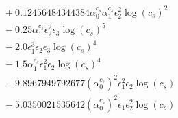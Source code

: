 \documentclass[10pt]{article}
\begin{document}
\begin{align*}
&{}  + 0.12456484344384 \alpha_{0}^{c_s} \alpha_{1}^{c_s} \epsilon_{2}^{2} \log{\left(c_{s} \right)}^{2} \\
&{}  - 0.25 \alpha_{1}^{c_s} \epsilon_{2}^{2} \epsilon_{3} \log{\left(c_{s} \right)}^{5} \\
&{}  - 2.0 \epsilon_{1}^{3} \epsilon_{2} \epsilon_{3} \log{\left(c_{s} \right)}^{4} \\
&{}  - 1.5 \alpha_{1}^{c_s} \epsilon_{1}^{2} \epsilon_{2} \log{\left(c_{s} \right)}^{4} \\
&{}  - 9.8967949792677 \left(\alpha_{0}^{c_s}\right)^{2} \epsilon_{1}^{2} \epsilon_{2} \log{\left(c_{s} \right)} \\
&{}  - 5.0350021535642 \left(\alpha_{0}^{c_s}\right)^{2} \epsilon_{1} \epsilon_{2}^{2} \log{\left(c_{s} \right)}
\end{align*}
\end{document}
